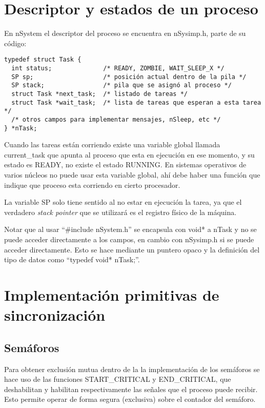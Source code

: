 \section{Descriptor y estados de un proceso}

En nSystem el descriptor del proceso se encuentra en nSysimp.h, parte de su código:
\begin{verbatim}
typedef struct Task {
  int status;              /* READY, ZOMBIE, WAIT_SLEEP_X */
  SP sp;                   /* posición actual dentro de la pila */
  SP stack;                /* pila que se asignó al proceso */
  struct Task *next_task;  /* listado de tareas */
  struct Task *wait_task;  /* lista de tareas que esperan a esta tarea */
  /* otros campos para implementar mensajes, nSleep, etc */
} *nTask;
\end{verbatim}

Cuando las tareas están corriendo existe una variable global llamada current\_task que apunta al proceso que esta en ejecución en ese momento, y su estado es READY, no existe el estado RUNNING. En sistemas operativos de varios núcleos no puede usar esta variable global, ahí debe haber una función que indique que proceso esta corriendo en cierto procesador.

La variable SP solo tiene sentido al no estar en ejecución la tarea, ya que el verdadero \textit{stack pointer} que se utilizará es el registro físico de la máquina.

Notar que al usar ``\#include nSystem.h'' se encapsula con void* a nTask y no se puede acceder directamente a los campos, en cambio con nSysimp.h si se puede acceder directamente. Esto se hace mediante un puntero opaco y la definición del tipo de datos como ``typedef void* nTask;''.

\section{Implementación primitivas de sincronización}

\subsection{Semáforos}
Para obtener exclusión mutua dentro de la la implementación de los semáforos se hace uso de las funciones START\_CRITICAL y END\_CRITICAL, que deshabilitan y habilitan respectivamente las señales que el proceso puede recibir. Esto permite operar de forma segura (exclusiva) sobre el contador del semáforo.

